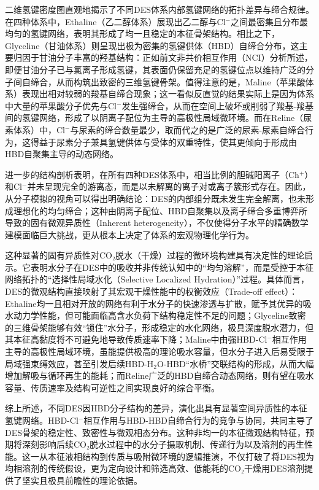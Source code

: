 \documentclass[AMA,LATO2COL]{WileyNJDv5} %
\begin{document}
二维氢键密度图直观地揭示了不同DES体系内部氢键网络的拓扑差异与缔合规律。在四种体系中，Ethaline（乙二醇体系）展现出乙二醇与Cl$^{-}$之间最密集且分布最均匀的氢键网络，表明其形成了均一且稳定的本征骨架结构。相比之下，Glyceline（甘油体系）则呈现出极为密集的氢键供体（HBD）自缔合分布，这主要归因于甘油分子丰富的羟基结构：正如前文非共价相互作用（NCI）分析所述，即便甘油分子已与氯离子形成氢键，其表面仍保留充足的氢键位点以维持广泛的分子间自缔合，从而构筑出致密的三维氢键骨架。值得注意的是，Maline（苹果酸体系）表现出相对较弱的羧基自缔合现象；这一看似反直觉的结果实际上是因为体系中大量的苹果酸分子优先与Cl$^{-}$发生强缔合，从而在空间上破坏或削弱了羧基-羧基间的氢键网络，形成了以阴离子配位为主导的高极性局域微环境。而在Reline（尿素体系）中，Cl$^{-}$与尿素的缔合数量最少，取而代之的是广泛的尿素-尿素自缔合行为，这得益于尿素分子兼具氢键供体与受体的双重特性，使其更倾向于形成由HBD自聚集主导的动态网络。

进一步的结构剖析表明，在所有四种DES体系中，相当比例的胆碱阳离子（Ch$^{+}$）和Cl$^{-}$并未呈现完全的游离态，而是以未解离的离子对或离子簇形式存在。因此，从分子模拟的视角可以得出明确结论：DES的内部组分既未发生完全解离，也未形成理想化的均匀缔合；这种由阴离子配位、HBD自聚集以及离子缔合多重博弈所导致的固有微观异质性（Inherent heterogeneity），不仅使得分子水平的精确数学建模面临巨大挑战，更从根本上决定了体系的宏观物理化学行为。

这种显著的固有异质性对CO₂脱水（干燥）过程的微环境构建具有决定性的理论启示。它表明水分子在DES中的吸收并非传统认知中的“均匀溶解”，而是受控于本征网络拓扑的“选择性局域水化（Selective Localized Hydration）”过程。具体而言，DES的微观结构直接映射了其宏观干燥性能中的权衡效应（Trade-off effect）：Ethaline均一且相对开放的网络有利于水分子的快速渗透与扩散，赋予其优异的吸水动力学性能，但可能面临高含水负荷下结构稳定性不足的问题；Glyceline致密的三维骨架能够有效“锁住”水分子，形成稳定的水化网络，极具深度脱水潜力，但其本征高黏度将不可避免地导致传质速率下降；Maline中由强HBD-Cl$^{-}$相互作用主导的高极性局域环境，虽能提供极高的理论吸水容量，但水分子进入后易受限于局域强束缚效应，甚至引发后续HBD-H$_{2}$O-HBD“水桥”交联结构的形成，从而大幅增加解吸与循环再生的能耗；而Reline广泛的HBD自缔合动态网络，则有望在吸水容量、传质速率及结构可逆性之间实现良好的综合平衡。

综上所述，不同DES因HBD分子结构的差异，演化出具有显著空间异质性的本征氢键网络。HBD-Cl$^{-}$相互作用与HBD-HBD自缔合行为的竞争与协同，共同主导了DES骨架的稳定性、致密性与微观相态分布。这种非均一的本征微观结构特征，预期将深刻影响后续CO₂脱水过程中的水分子摄取机制、传递行为以及溶剂的再生性能。这一从本征液相结构到传质与吸附微环境的逻辑推演，不仅打破了将DES视为均相溶剂的传统假设，更为定向设计和筛选高效、低能耗的CO₂干燥用DES溶剂提供了坚实且极具前瞻性的理论依据。
\end{document}
